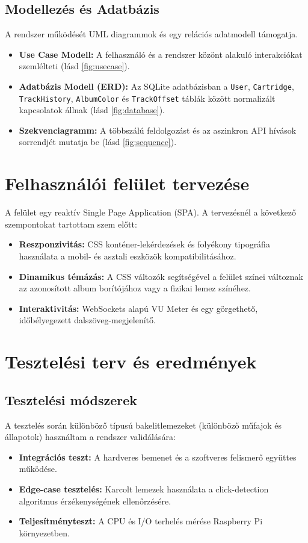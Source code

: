 \documentclass[12pt,a4paper,hungarian]{report}
\begin{document}
\subsection{Modellezés és Adatbázis}
A rendszer működését UML diagrammok és egy relációs adatmodell támogatja. 
\begin{itemize}
    \item \textbf{Use Case Modell:} A felhasználó és a rendszer közönt alakuló interakciókat szemlélteti (lásd \ref{fig:usecase}).
    \item \textbf{Adatbázis Modell (ERD):} Az SQLite adatbázisban a \texttt{User}, \texttt{Cartridge}, \texttt{TrackHistory}, \texttt{AlbumColor} és \texttt{TrackOffset} táblák között normalizált kapcsolatok állnak (lásd \ref{fig:database}).
    \item \textbf{Szekvenciagramm:} A többszálú feldolgozást és az aszinkron API hívások sorrendjét mutatja be (lásd \ref{fig:sequence}).
\end{itemize}

\section{Felhasználói felület tervezése}
A felület egy reaktív Single Page Application (SPA). A tervezésnél a következő szempontokat tartottam szem előtt:
\begin{itemize}
    \item \textbf{Reszponzivitás:} CSS konténer-lekérdezések és folyékony tipográfia használata a mobil- és asztali eszközök kompatibilitásához.
    \item \textbf{Dinamikus témázás:} A CSS változók segítségével a felület színei változnak az azonosított album borítójához vagy a fizikai lemez színéhez.
    \item \textbf{Interaktivitás:} WebSockets alapú VU Meter és egy görgethető, időbélyegezett dalszöveg-megjelenítő.
\end{itemize}

\section{Tesztelési terv és eredmények}

\subsection{Tesztelési módszerek}
A tesztelés során különböző típusú bakelitlemezeket (különböző műfajok és állapotok) használtam a rendszer validálására:
\begin{itemize}
    \item \textbf{Integrációs teszt:} A hardveres bemenet és a szoftveres felismerő együttes működése.
    \item \textbf{Edge-case tesztelés:} Karcolt lemezek használata a click-detection algoritmus érzékenységének ellenőrzésére.
    \item \textbf{Teljesítményteszt:} A CPU és I/O terhelés mérése Raspberry Pi környezetben.
\end{itemize}
\end{document}
